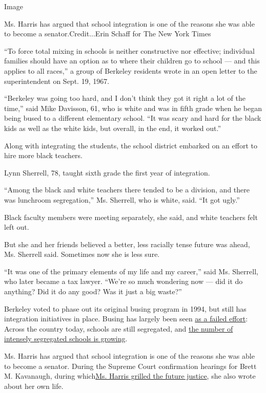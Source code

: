 Image

Ms. Harris has argued that school integration is one of the reasons she
was able to become a senator.Credit...Erin Schaff for The New York Times

``To force total mixing in schools is neither constructive nor
effective; individual families should have an option as to where their
children go to school --- and this applies to all races,'' a group of
Berkeley residents wrote in an open letter to the superintendent on
Sept. 19, 1967.

``Berkeley was going too hard, and I don't think they got it right a lot
of the time,'' said Mike Davisson, 61, who is white and was in fifth
grade when he began being bused to a different elementary school. ``It
was scary and hard for the black kids as well as the white kids, but
overall, in the end, it worked out.''

Along with integrating the students, the school district embarked on an
effort to hire more black teachers.

Lynn Sherrell, 78, taught sixth grade the first year of integration.

``Among the black and white teachers there tended to be a division, and
there was lunchroom segregation,'' Ms. Sherrell, who is white, said.
``It got ugly.''

Black faculty members were meeting separately, she said, and white
teachers felt left out.

But she and her friends believed a better, less racially tense future
was ahead, Ms. Sherrell said. Sometimes now she is less sure.

``It was one of the primary elements of my life and my career,'' said
Ms. Sherrell, who later became a tax lawyer. ``We're so much wondering
now --- did it do anything? Did it do any good? Was it just a big
waste?''

Berkeley voted to phase out its original busing program in 1994, but
still has integration initiatives in place. Busing has largely been seen
\href{https://www.nytimes3xbfgragh.onion/1975/12/21/archives/busing-the-solution-that-has-failed-to-solve.html}{as
a failed effort}: Across the country today, schools are still
segregated, and
\href{https://www.nytimes3xbfgragh.onion/2019/05/10/us/threatening-the-future-the-high-stakes-of-deepening-school-segregation.html?action=click\&module=News\&pgtype=Homepage}{the
number of intensely segregated schools is growing}.

Ms. Harris has argued that school integration is one of the reasons she
was able to become a senator. During the Supreme Court confirmation
hearings for Brett M. Kavanaugh, during
which\href{https://www.nytimes3xbfgragh.onion/2018/09/06/us/politics/kavanaugh-hearings-kamala-harris-cory-booker.html}{Ms.
Harris grilled the future justice}, she also wrote about her own life.

